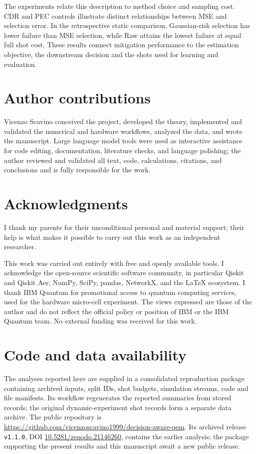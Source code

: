 \documentclass[a4paper,onecolumn,unpublished,nopdfoutputerror]{quantumarticle}
\theoremstyle{plain}
\theoremstyle{definition}
\newcommand{\1}{\mathbf{1}}
\begin{document}
The experiments relate this description to method choice and sampling cost. CDR and PEC controls illustrate distinct relationships between MSE and selection error. In the retrospective static comparison, Gaussian-risk selection has lower failure than MSE selection, while Raw attains the lowest failure at equal full shot cost. These results connect mitigation performance to the estimation objective, the downstream decision and the shots used for learning and evaluation.

\section*{Author contributions}

Vicenzo Scavino conceived the project, developed the theory, implemented and validated the numerical and hardware workflows, analyzed the data, and wrote the manuscript.  Large language model tools were used as interactive assistance for code editing, documentation, literature checks, and language polishing; the author reviewed and validated all text, code, calculations, citations, and conclusions and is fully responsible for the work.

\section*{Acknowledgments}

I thank my parents for their unconditional personal and material support; their help is what makes it possible to carry out this work as an independent researcher.

This work was carried out entirely with free and openly available tools.  I acknowledge the open-source scientific software community, in particular Qiskit and Qiskit Aer, NumPy, SciPy, pandas, NetworkX, and the LaTeX ecosystem.  I thank IBM Quantum for promotional access to quantum computing services, used for the hardware micro-cell experiment.  The views expressed are those of the author and do not reflect the official policy or position of IBM or the IBM Quantum team.  No external funding was received for this work.

\section*{Code and data availability}

The analyses reported here are supplied in a consolidated reproduction package containing archived inputs, split IDs, shot budgets, simulation streams, code and file manifests. Its workflow regenerates the reported summaries from stored records; the original dynamic-experiment shot records form a separate data archive. The public repository is \url{https://github.com/vicenzoscavino1999/decision-aware-qem}. Its archived release \texttt{v1.1.0}, DOI \href{https://doi.org/10.5281/zenodo.21146260}{10.5281/zenodo.21146260}, contains the earlier analysis; the package supporting the present results and this manuscript await a new public release.
\end{document}
